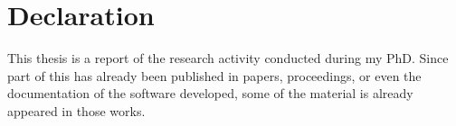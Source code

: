 

\chapter*{Declaration}
%
	{}

\noindent
This thesis is a report of the research activity conducted during my PhD.
%
Since part of this has already been published in papers, proceedings, or even
the documentation of the software developed, some of the material is already
appeared in those works.

